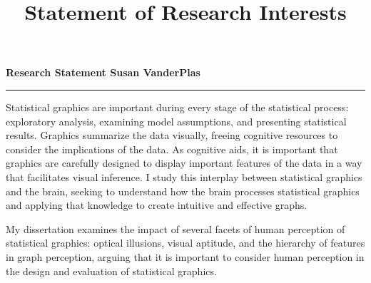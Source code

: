 \documentclass[10.5pt,letterpaper,sans,unicode]{moderncv}        %
\title{Statement of Research Interests}                               %
\begin{document}
\setlength{\parindent}{15pt} %
\noindent\textbf{\Large Research Statement \hfill Susan VanderPlas}\vspace{-3pt}\\\hrule\vspace{6pt}
Statistical graphics are important during every stage of the statistical process: exploratory analysis, examining model assumptions, and presenting statistical results. 
Graphics summarize the data visually, freeing cognitive resources to consider the implications of the data. 
As cognitive aids, it is important that graphics are carefully designed to display important features of the data in a way that facilitates visual inference. 
I study this interplay between statistical graphics and the brain, seeking to understand how the brain processes statistical graphics and applying that knowledge to create intuitive and effective graphs. 




\vspace{.3cm}\hspace{8pt} My dissertation examines the impact of several facets of human perception of statistical graphics: optical illusions, visual aptitude, and the hierarchy of features in graph perception, arguing that it is important to consider human perception in the design and evaluation of statistical graphics. 
\end{document}
